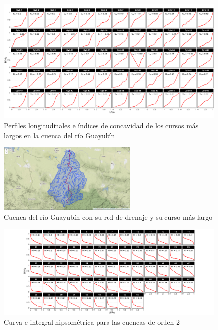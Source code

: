 \documentclass[11pt,]{article}
\begin{document}
\begin{figure}
\centering
\includegraphics[width=1.00000\textwidth]{Indices de concavidad.png}
\caption{Perfiles longitudinales e índices de concavidad de los cursos
más largos en la cuenca del río Guayubín\label{indicec}}
\end{figure}

\begin{figure}
\centering
\includegraphics[width=0.60000\textwidth]{cuenca-red de drenaje-curso mas largo.png}
\caption{Cuenca del río Guayubín con su red de drenaje y su curso más
largo\label{vectoresrbasin}}
\end{figure}

\begin{figure}
\centering
\includegraphics[width=1.10000\textwidth]{HypsoBasinOrder2.png}
\caption{Curva e integral hipsométrica para las cuencas de orden
2\label{hypsob2}}
\end{figure}
\end{document}
